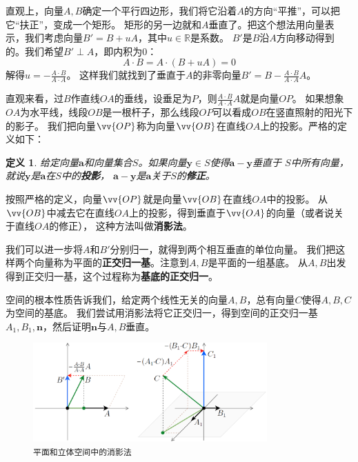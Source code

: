 \documentclass[12pt,UTF8]{ctexbook}
\newtheorem{df}{定义}[section]
\begin{document}
直观上，向量$A,B$确定一个平行四边形，我们将它沿着$A$的方向“平推”，可以把它“扶正”，变成一个矩形。
矩形的另一边就和$A$垂直了。把这个想法用向量表示，我们考虑向量$B' = B + uA$，其中$u\in\mathbb{R}$是系数。
$B'$是$B$沿$A$方向移动得到的。我们希望$B'\perp A$，即内积为$0$：
$$ A\cdot B = A\cdot (B + uA) = 0$$
解得$u = -\frac{A\cdot B}{A\cdot A}$。
这样我们就找到了垂直于$A$的非零向量$B' = B -\frac{A\cdot B}{A\cdot A}A$。

直观来看，过$B$作直线$OA$的垂线，设垂足为$P$，则$\frac{A\cdot B}{A\cdot A}A$就是向量$OP$。
如果想象$OA$为水平线，线段$OB$是一根杆子，那么线段$OP$可以看成$OB$在竖直照射的阳光下的影子。
我们把向量$\vv{OP}$称为向量$\vv{OB}$在直线$OA$上的投影。严格的定义如下：
\begin{df}\label{df:1-3-20}
    给定向量$\mathbf{a}$和向量集合$S$。如果向量$\mathbf{y}\in S$使得$\mathbf{a} - \mathbf{y}$垂直于
    $S$中所有向量，就说$\mathbf{y}$是$\mathbf{a}$在$S$中的\textbf{投影}，
    $\mathbf{a} - \mathbf{y}$是$\mathbf{a}$关于$S$的\textbf{修正}。
\end{df}
按照严格的定义，向量$\vv{OP}$就是向量$\vv{OB}$在直线$OA$中的投影。
从$\vv{OB}$中减去它在直线$OA$上的投影，得到垂直于$\vv{OA}$的向量（或者说关于直线$OA$的修正），
这种方法叫做\textbf{消影法}。

我们可以进一步将$A$和$B'$分别归一，就得到两个相互垂直的单位向量。
我们把这样两个向量称为平面的\textbf{正交归一基}。注意到$A,B$是平面的一组基底。
从$A,B$出发得到正交归一基，这个过程称为\textbf{基底的正交归一}。

空间的根本性质告诉我们，给定两个线性无关的向量$A,B$，总有向量$C$使得$A,B,C$为空间的基底。
我们尝试用消影法将它正交归一，得到空间的正交归一基$A_1,B_1,\mathbf{n}$，然后证明$\mathbf{n}$与$A,B$垂直。

\begin{figure}[h] 
    \centering
    \includegraphics[width=0.8\textwidth]{消影法1.png}
    \caption*{\texttt{平面和立体空间中的消影法}}
\end{figure}
\end{document}
